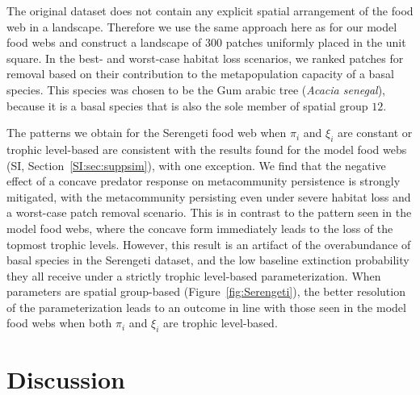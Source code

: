 \documentclass[11pt]{article}
\newcommand{\rem}[1]{\textcolor{red}{#1}}
\newcommand{\SI}{SI}
\begin{document}
The original dataset does not contain any explicit spatial arrangement of the food web in a landscape. Therefore we use the same approach here as for our model food webs and construct a landscape of $300$ patches uniformly placed in the unit square. In the best- and worst-case habitat loss scenarios, we ranked patches for removal based on their contribution to the metapopulation capacity of a basal species. This species was chosen to be the Gum arabic tree (\textit{Acacia senegal}), because it is a basal species that is also the sole member of spatial group $12$. %

The patterns we obtain for the Serengeti food web when $\pi_i$ and $\xi_i$ are constant or trophic level-based are consistent with the results found for the model food webs (\SI, Section~\ref{SI:sec:suppsim}), with one exception. We find that the negative effect of a concave predator response on metacommunity persistence is strongly mitigated, with the metacommunity persisting even under severe habitat loss and a worst-case patch removal scenario. This is in contrast to the pattern seen in the model food webs, where the concave form immediately leads to the loss of the topmost trophic levels. However, this result is an artifact of the overabundance of basal species in the Serengeti dataset, and the low baseline extinction probability they all receive under a strictly trophic level-based parameterization. When parameters are spatial group-based (Figure~\ref{fig:Serengeti}), the better resolution of the parameterization leads to an outcome in line with those seen in the model food webs when both $\pi_i$ and $\xi_i$ are trophic level-based.


\section{Discussion} \label{sec:discussion}
\end{document}
